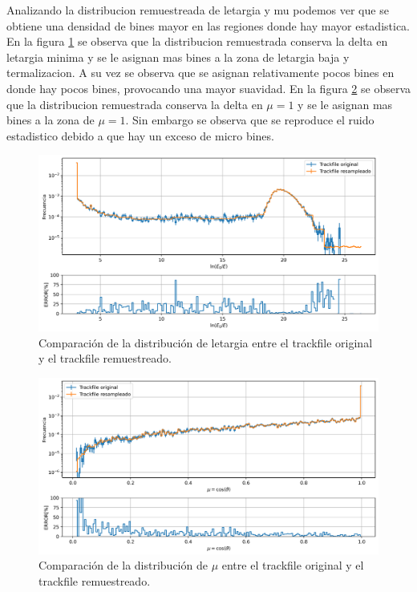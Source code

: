 Analizando la distribucion remuestreada de letargia y mu podemos ver que se obtiene una densidad de bines mayor en las regiones donde hay mayor estadistica. En la figura \ref{fig:trackfile1_config1_letargia_adaptativo} se observa que la distribucion remuestrada conserva la delta en letargia minima y se le asignan mas bines a la zona de letargia baja y termalizacion. A su vez se observa que se asignan relativamente pocos bines en donde hay pocos bines, provocando una mayor suavidad. En la figura \ref{fig:trackfile1_config1_mu_adaptativo} se observa que la distribucion remuestrada conserva la delta en $\mu = 1$ y se le asignan mas bines a la zona de $\mu = 1$. Sin embargo se observa que se reproduce el ruido estadistico debido a que hay un exceso de micro bines. 

\begin{figure}[H]
    \centering
    \includegraphics[width=\textwidth]{figs/fig4_10.png}
    \caption{Comparación de la distribución de letargia entre el trackfile original y el trackfile remuestreado.}
    \label{fig:trackfile1_config1_letargia_adaptativo}
\end{figure}

\begin{figure}[H]
    \centering
    \includegraphics[width=\textwidth]{figs/fig4_11.png}
    \caption{Comparación de la distribución de $\mu$ entre el trackfile original y el trackfile remuestreado.}
    \label{fig:trackfile1_config1_mu_adaptativo}
\end{figure}

